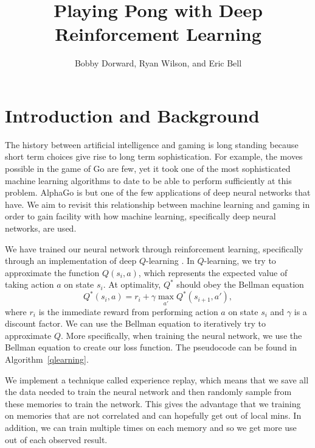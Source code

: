 \documentclass[12pt]{article}
\theoremstyle{plain}
\theoremstyle{definition}
\theoremstyle{remark}
\theoremstyle{plain}
\begin{document}
\title{Playing Pong with Deep Reinforcement Learning}
\author{Bobby Dorward, Ryan Wilson, and Eric Bell}
\maketitle

\section{Introduction and Background}
\par 
The history between artificial intelligence and gaming is long standing because short term choices give rise to long term sophistication.  For example, the moves possible in the game of Go are few, yet it took one of the most sophisticated machine learning algorithms to date to be able to perform sufficiently at this problem.  AlphaGo is but one of the few applications of deep neural networks that have. We aim to revisit this relationship between machine learning and gaming in order to gain facility with how machine learning, specifically deep neural networks, are used.
\par
We have trained our neural network through reinforcement learning, specifically through an implementation of deep $Q$-learning \cite{deepatari}. In $Q$-learning, we try to approximate the function $Q(s_i,a)$, which represents the expected value of taking action $a$ on state $s_i$. At optimality, $Q^*$ should obey the Bellman equation $$Q^*(s_i,a) = r_i + \gamma \max_{a'}Q^*(s_{i+1},a'),$$
where $r_i$ is the immediate reward from performing action $a$ on state $s_i$ and $\gamma$ is a discount factor. We can use the Bellman equation to iteratively try to approximate $Q$. More specifically, when training the neural network, we use the Bellman equation to create our loss function. The pseudocode can be found in Algorithm~\ref{qlearning}. 

We implement a technique called experience replay, which means that we save all the data needed to train the neural network and then randomly sample from these memories to train the network. This gives the advantage that we training on memories that are not correlated and can hopefully get out of local mins. In addition, we can train multiple times on each memory and so we get more use out of each observed result.
\end{document}
